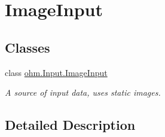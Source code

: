 \hypertarget{group___image_input}{}\section{Image\+Input}
\label{group___image_input}
\subsection*{Classes}
\begin{DoxyCompactItemize}
\item 
class \hyperlink{classohm_1_1_input_1_1_image_input}{ohm.\+Input.\+Image\+Input}
\begin{DoxyCompactList}\small\item\em A source of input data, uses static images. \end{DoxyCompactList}\end{DoxyCompactItemize}


\subsection{Detailed Description}

